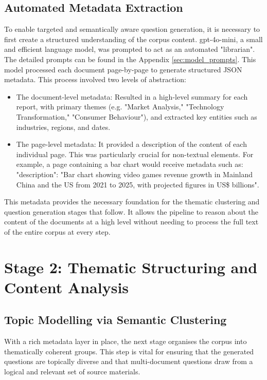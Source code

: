\documentclass[12pt,twoside]{report}
\begin{document}
\subsection{Automated Metadata Extraction}

To enable targeted and semantically aware question generation, it is necessary to first create a structured understanding of the corpus content. gpt-4o-mini\cite{OpenAIModel}, a small and efficient language model, was prompted to act as an automated "librarian". The detailed prompts can be found in the Appendix \ref{sec:model_prompts}. This model processed each document page-by-page to generate structured JSON metadata. This process involved two levels of abstraction:
\begin{itemize}
    \item{The document-level metadata}: Resulted in a high-level summary for each report, with primary themes (e.g. "Market Analysis," "Technology Transformation," "Consumer Behaviour"), and extracted key entities such as industries, regions, and dates.
    \item{The page-level metadata}: It provided a description of the content of each individual page. This was particularly crucial for non-textual elements. For example, a page containing a bar chart would receive metadata such as: "description": "Bar chart showing video games revenue growth in Mainland China and the US from 2021 to 2025, with projected figures in US\$ billions".
\end{itemize}

This metadata provides the necessary foundation for the thematic clustering and question generation stages that follow. It allows the pipeline to reason about the content of the documents at a high level without needing to process the full text of the entire corpus at every step.

\section{Stage 2: Thematic Structuring and Content Analysis}

\subsection{Topic Modelling via Semantic Clustering}

With a rich metadata layer in place, the next stage organises the corpus into thematically coherent groups. This step is vital for ensuring that the generated questions are topically diverse and that multi-document questions draw from a logical and relevant set of source materials.
\end{document}
